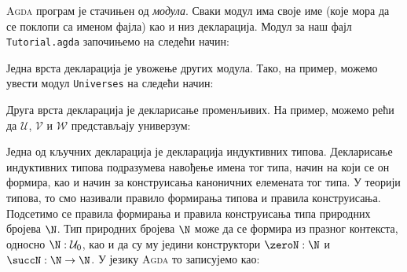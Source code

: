 \textsc{Agda} програм је стачињен од \emph{модула}. Сваки модул има своје име (које мора да се поклопи са именом фајла) као и низ декларација. Модул за наш фајл \texttt{Tutorial.agda} започињемо на следећи начин:
\begin{code}%
\>[0]\AgdaSpace{}%
\AgdaSpace{}%
\<%
\end{code}

Једна врста декларација је увожење других модула. Тако, на пример, можемо увести модул \texttt{Universes} на следећи начин: 
\begin{code}%
\>[0]\AgdaSpace{}%
\AgdaSpace{}%
\AgdaSpace{}%
\<%
\end{code}

Друга врста декларација је декларисање променљивих. На пример, можемо рећи да $\mathcal{U}$, $\mathcal{V}$ и $\mathcal{W}$ представљају универзум:
\begin{code}%
\>[0]\AgdaSpace{}%
\AgdaSpace{}%
\AgdaSpace{}%
\AgdaSpace{}%
\AgdaSymbol{:}\AgdaSpace{}%
\<%
\end{code}

Једна од кључних декларација је декларација индуктивних типова. Декларисање индуктивних типова подразумева навођење имена тог типа, начин на који се он формира, као и начин за конструисања каноничних елемената тог типа. У теорији типова, то смо називали правило формирања типова и правила конструисања. Подсетимо се правила формирања и правила конструисања типа природних бројева $\N$. Тип природних бројева $\N$ може да се формира из празног контекста, односно $\N : \mathcal{U}_0$, као и да су му једини конструктори $\zeroN : \N$ и $\succN : \N \to \N$. У језику \textsc{Agda} то записујемо као: 
\begin{code}%
\>[0]\AgdaSpace{}%
\AgdaSpace{}%
\AgdaSymbol{:}\AgdaSpace{}%
\AgdaSpace{}%
\AgdaSpace{}%
\<%
\\
\>[0][@{}l@{\AgdaIndent{0}}]%
\>[4]\AgdaSpace{}%
\AgdaSymbol{:}\AgdaSpace{}%
\<%
\\
%
\>[4]\AgdaSpace{}%
\AgdaSymbol{:}\AgdaSpace{}%
\AgdaSpace{}%
\AgdaSpace{}%
\<%
\\
\>[0]\<%
\\
\>[0]\AgdaSymbol{\{-\#}\AgdaSpace{}%
\AgdaSpace{}%
\AgdaSpace{}%
\AgdaSpace{}%
\AgdaSymbol{\#-\}}\<%
\end{code}

